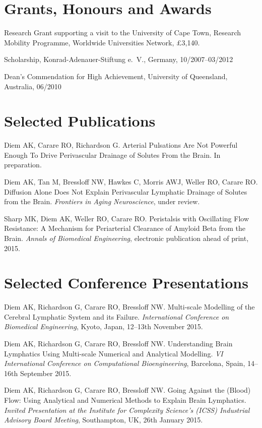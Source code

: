 \documentclass[margin,line]{res}
\begin{document}
\begin{resume}
\section{\sc Grants, Honours and Awards} 
Research Grant supporting a visit to the University of Cape Town, Research Mobility Programme, Worldwide Universities Network, £3,140.\vspace*{-.1in}

Scholarship, Konrad-Adenauer-Stiftung e.~V., Germany, 10/2007--03/2012\vspace*{-.1in}

Dean's Commendation for High Achievement, University of Queensland, Australia, 06/2010\vspace*{-.1in}


\section{\sc Selected Publications}
Diem AK, Carare RO, Richardson G. Arterial Pulsations Are Not Powerful Enough To Drive Perivascular Drainage of Solutes From the Brain. In preparation.\vspace*{-.1in}

Diem AK, Tan M, Bressloff NW, Hawkes C, Morris AWJ, Weller RO, Carare RO. Diffusion Alone Does Not Explain Perivascular Lymphatic Drainage of Solutes from the Brain. \textit{Frontiers in Aging Neuroscience}, under review.\vspace*{-.1in}

Sharp MK, Diem AK, Weller RO, Carare RO. Peristalsis with Oscillating Flow Resistance: A Mechanism for Periarterial Clearance of Amyloid Beta from the Brain. \textit{Annals of Biomedical Engineering}, electronic publication ahead of print, 2015.\vspace*{-.1in}


\section{\sc Selected Conference Presentations}
Diem AK, Richardson G, Carare RO, Bressloff NW. Multi-scale Modelling of the Cerebral Lymphatic System and its Failure. \textit{International Conference on Biomedical Engineering}, Kyoto, Japan, 12--13th November 2015.\vspace*{-.1in}

Diem AK, Richardson G, Carare RO, Bressloff NW. Understanding Brain Lymphatics Using Multi-scale Numerical and Analytical Modelling. \textit{VI International Conference on Computational Bioengineering}, Barcelona, Spain, 14--16th September 2015.\vspace*{-.1in}

Diem AK, Richardson G, Carare RO, Bressloff NW. Going Against the (Blood) Flow: Using Analytical and Numerical Methods to Explain Brain Lymphatics. \textit{Invited Presentation at the Institute for Complexity Science's (ICSS) Industrial Advisory Board Meeting}, Southampton, UK, 26th January 2015.\vspace*{-.1in}



\end{resume}
\end{document}
